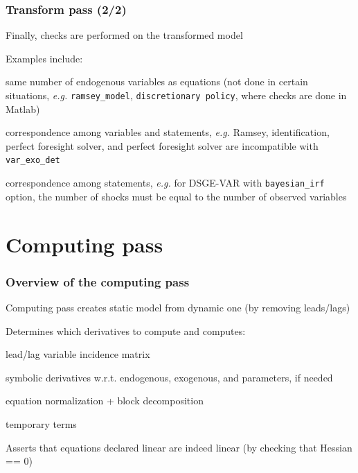 \documentclass[handout,usepdftitle=false,xcolor=dvipsnames,aspectratio=169]{beamer}
\begin{document}
\begin{frame}
  \frametitle{Transform pass (2/2)}
  \begin{witemize}
  \item Finally, checks are performed on the transformed model
  \item Examples include:
    \begin{witemize}
    \item same number of endogenous variables as equations (not done in certain situations, \textit{e.g.} \texttt{ramsey\_model}, \texttt{discretionary\ policy}, where checks are done in Matlab)
    \item correspondence among variables and statements, \textit{e.g.} Ramsey, identification, perfect foresight solver, and perfect foresight solver are incompatible with \texttt{var\_exo\_det}
    \item correspondence among statements, \textit{e.g.} for DSGE-VAR with \texttt{bayesian\_irf} option, the number of shocks must be equal to the number of observed variables
    \end{witemize}
  \end{witemize}
\end{frame}


\section{Computing pass}

\begin{frame}
  \frametitle{Overview of the computing pass}
  \begin{witemize}
  \item Computing pass creates static model from dynamic one (by removing leads/lags)
  \item Determines which derivatives to compute and computes:
    \begin{witemize}
    \item lead/lag variable incidence matrix
    \item symbolic derivatives w.r.t. endogenous, exogenous, and parameters, if needed
    \item equation normalization + block decomposition
    \item temporary terms
    \end{witemize}
  \item Asserts that equations declared linear are indeed linear (by checking that Hessian == 0)
  \end{witemize}
\end{frame}
\end{document}
